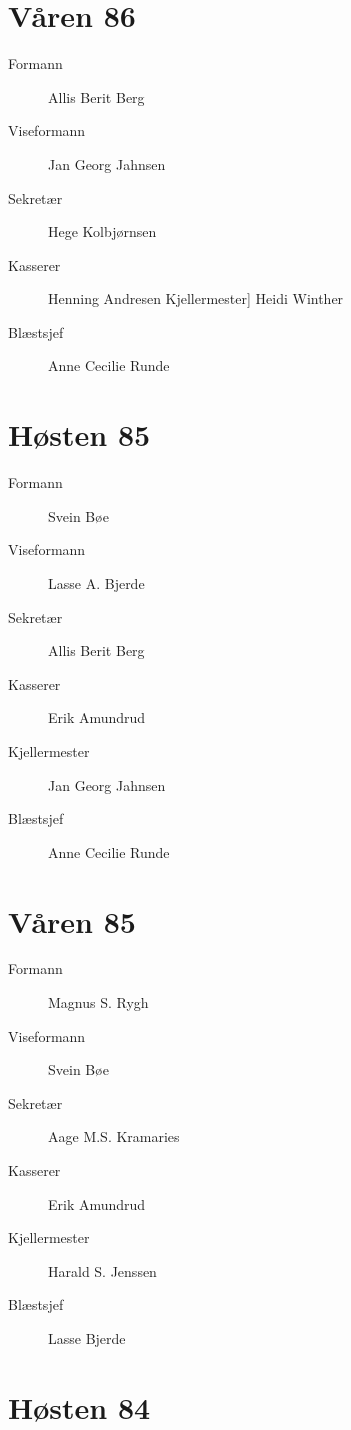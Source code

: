 \section*{Våren 86}

\begin{description}
	\item[Formann]  Allis Berit Berg
	\item[Viseformann] Jan Georg Jahnsen
	\item[Sekretær] Hege Kolbjørnsen
	\item[Kasserer] Henning Andresen
Kjellermester] Heidi Winther
	\item[Blæstsjef] Anne Cecilie Runde
\end{description}

\section*{Høsten 85}

\begin{description}
	\item[Formann]  Svein Bøe
	\item[Viseformann] Lasse A. Bjerde
	\item[Sekretær] Allis Berit Berg
	\item[Kasserer] Erik Amundrud
	\item[Kjellermester] Jan Georg Jahnsen
	\item[Blæstsjef] Anne Cecilie Runde
\end{description}

\section*{Våren 85}

\begin{description}
	\item[Formann]  Magnus S. Rygh
	\item[Viseformann] Svein Bøe
	\item[Sekretær] Aage M.S. Kramaries
	\item[Kasserer] Erik Amundrud
	\item[Kjellermester] Harald S. Jenssen
	\item[Blæstsjef] Lasse Bjerde
\end{description}

\section*{Høsten 84}


